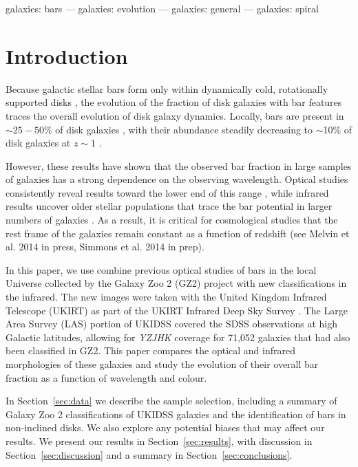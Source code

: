 \documentclass[useAMS,usenatbib]{mn2e}
\begin{document}
\begin{keywords}

    galaxies: bars 
    --- 
    galaxies: evolution
    --- 
    galaxies: general 
    --- 
    galaxies: spiral 

\end{keywords}

%
%  
\section{Introduction}
%
%

Because galactic stellar bars form only within dynamically cold, rotationally supported disks \citep{com09a,ath13}, the evolution of the fraction of disk galaxies with bar features traces the overall evolution of disk galaxy dynamics. Locally, bars are present in $\sim 25 - 50\%$ of disk galaxies \citep[e.g.][]{mas11c,agu09}, with their abundance steadily decreasing to $\sim$10\% of disk galaxies at $z \sim 1$ \citep{she08a, elm04}. 

However, these results have shown that the observed bar fraction in large samples of galaxies has a strong dependence on the observing wavelength. Optical studies consistently reveal results toward the lower end of this range \citep{mas11c}, while infrared results uncover older stellar populations that trace the bar potential in larger numbers of galaxies \citep{she08a}. As a result, it is critical for cosmological studies that the rest frame of the galaxies remain constant as a function of redshift (see Melvin et al. 2014 in press, Simmons et al. 2014 in prep). 

In this paper, we use combine previous optical studies of bars in the local Universe collected by the Galaxy Zoo 2 (GZ2) project \citep{wil13} with new classifications in the infrared. The new images were taken with the United Kingdom Infrared Telescope (UKIRT) as part of the UKIRT Infrared Deep Sky Survey \citep[UKIDSS;][]{law07,war07}. The Large Area Survey (LAS) portion of UKIDSS covered the SDSS observations at high Galactic latitudes, allowing for \emph{YZJHK} coverage for 71,052 galaxies that had also been classified in GZ2. This paper compares the optical and infrared morphologies of these galaxies and study the evolution of their overall bar fraction as a function of wavelength and colour. 

In Section~\ref{sec:data} we describe the sample selection, including a summary of Galaxy Zoo 2 classifications of UKIDSS galaxies and the identification of bars in non-inclined disks. We also explore any potential biases that may affect our results. We present our results in Section~\ref{sec:results}, with discussion in Section~\ref{sec:discussion} and a summary in Section~\ref{sec:conclusions}. 
\end{document}
